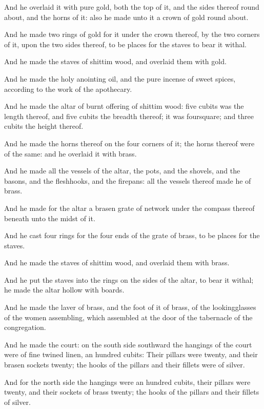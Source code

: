 \Verse And he overlaid it with pure gold, both the top of it, and the sides thereof round about, and the horns of it: also he made unto it a crown of gold round about.

\Verse And he made two rings of gold for it under the crown thereof, by the two corners of it, upon the two sides thereof, to be places for the staves to bear it withal.

\Verse And he made the staves of shittim wood, and overlaid them with gold.

\Verse And he made the holy anointing oil, and the pure incense of sweet spices, according to the work of the apothecary.

\Chapter
\Verse And he made the altar of burnt offering of shittim wood: five cubits was the length thereof, and five cubits the breadth thereof; it was foursquare; and three cubits the height thereof.

\Verse And he made the horns thereof on the four corners of it; the horns thereof were of the same: and he overlaid it with brass.

\Verse And he made all the vessels of the altar, the pots, and the shovels, and the basons, and the fleshhooks, and the firepans: all the vessels thereof made he of brass.

\Verse And he made for the altar a brasen grate of network under the compass thereof beneath unto the midst of it.

\Verse And he cast four rings for the four ends of the grate of brass, to be places for the staves.

\Verse And he made the staves of shittim wood, and overlaid them with brass.

\Verse And he put the staves into the rings on the sides of the altar, to bear it withal; he made the altar hollow with boards.

\Verse And he made the laver of brass, and the foot of it of brass, of the lookingglasses of the women assembling, which assembled at the door of the tabernacle of the congregation.

\Verse And he made the court: on the south side southward the hangings of the court were of fine twined linen, an hundred cubits: \Verse Their pillars were twenty, and their brasen sockets twenty; the hooks of the pillars and their fillets were of silver.

\Verse And for the north side the hangings were an hundred cubits, their pillars were twenty, and their sockets of brass twenty; the hooks of the pillars and their fillets of silver.

